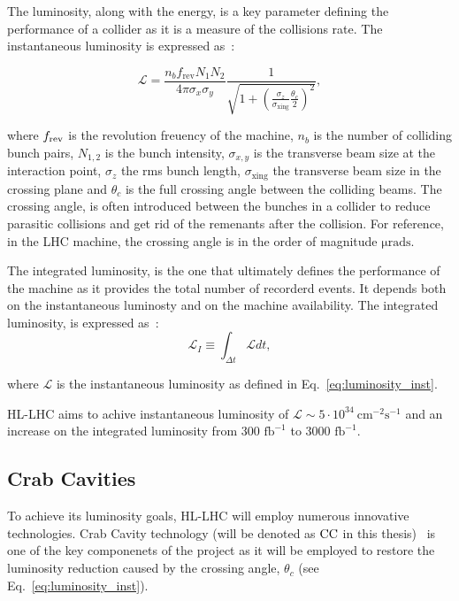 The luminosity, along with the energy, is a key parameter defining the performance of a collider as it is a measure of the collisions rate. The instantaneous luminosity is expressed as~\cite{luminosity}:

\begin{equation}\label{eq:luminosity_inst}
    \mathcal{L} = \frac{n_b f_\mathrm{rev}N_1 N_2}{4 \pi \sigma_x \sigma_y} \frac{1}{\sqrt{1+(\frac{\sigma_z}{\sigma_\mathrm{xing}} \frac{\theta_c}{2})^2}},
\end{equation}

where ${f_\mathrm{rev}}$ is the revolution freuency of the machine, $n_b$ is the number of colliding bunch pairs, $N_{1,2}$ is the bunch intensity, $\sigma_{x,y}$ is the transverse beam size at the interaction point, $\sigma_z$ the rms bunch length, $\sigma_{\mathrm{xing}}$ the transverse beam size in the crossing plane and $\theta_c$ is the full crossing angle between the colliding beams. The crossing angle, is often introduced between the bunches in a collider to reduce parasitic collisions and get rid of the remenants after the collision. For reference, in the LHC machine, the crossing angle is in the order of magnitude $\mathrm{\mathrm{\mu rads}}$.


The integrated luminosity, is the one that ultimately defines the performance of the machine as it provides the total number of recorderd events. It depends both on the instantaneous luminosty and on the machine availability. The integrated luminosity, is expressed as~\cite{HL_LHC_yellow_report}:
\begin{equation}\label{eq:integrated_luminosity}
    \mathcal{L}_I \equiv \int_{\Delta t} \mathcal{L} dt,
\end{equation}

where $\mathcal{L}$ is the instantaneous luminosity as defined in Eq.~\eqref{eq:luminosity_inst}.

HL-LHC aims to achive instantaneous luminosity of $\mathcal{L} \sim 5 \cdot 10^{34} \ \mathrm{cm^{-2} s^{-1}}$ and an increase on the integrated luminosity from 300 $\mathrm{fb^{-1}}$ to 3000 $\mathrm{fb^{-1}}$. %

\subsection{Crab Cavities}\label{subsec:CC_intro}
To achieve its luminosity goals, HL-LHC will employ numerous innovative technologies. Crab Cavity technology (will be denoted as ${\mathrm{CC}}$ in this thesis)~\cite{Calaga:2673544} is one of the key componenets of the project as it will be employed to restore the luminosity reduction caused by the crossing angle, $\theta_c$ (see Eq.~\eqref{eq:luminosity_inst}).

